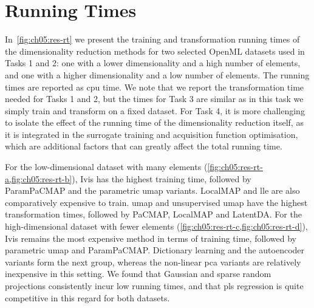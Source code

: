 
\FloatBarrier
\section{Running Times}
\label{sec:ch05:rt}

In~\cref{fig:ch05:res-rt} we present the training and transformation running times of the dimensionality reduction methods for two selected OpenML datasets
used in Tasks 1 and 2: one with a lower dimensionality and a high number of elements, and one with a higher dimensionality and a low number of elements.
The running times are reported as \gls{cpu} time.
We note that we report the transformation time
needed for Tasks 1 and 2,
but the times for Task 3 are similar
as in this task we simply train and transform on a fixed dataset.
For Task 4, it is
more challenging to isolate
the effect of the running time of the dimensionality reduction itself, as it is
integrated in
the surrogate training and acquisition function optimisation, which are additional factors that can greatly affect the total running time.

For the low-dimensional dataset with many elements (\cref{fig:ch05:res-rt-a,fig:ch05:res-rt-b}), Ivis has the highest training time, followed by ParamPaCMAP and the parametric \gls{umap} variants. LocalMAP and \gls{lle} are also comparatively expensive to train. \gls{umap} and unsupervised \gls{umap} have the highest transformation times, followed by PaCMAP, LocalMAP and LatentDA.
For the high-dimensional dataset with fewer elements (\cref{fig:ch05:res-rt-c,fig:ch05:res-rt-d}), Ivis remains the most expensive method
in terms of training time, followed by parametric \gls{umap} and ParamPaCMAP. Dictionary learning and the autoencoder variants form the next group, whereas the non-linear \gls{pca} variants are relatively inexpensive in this setting.
We found that Gaussian and sparse random projections consistently incur low running times, and that \gls{pls} regression is quite competitive in this regard for both datasets.

